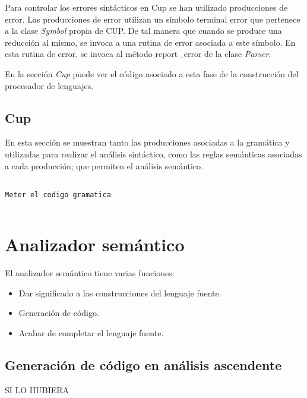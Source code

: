 Para controlar los errores sintácticos en Cup se han utilizado producciones de error. Las producciones de error utilizan un símbolo terminal error que pertenece a la clase \textit{Symbol} propia de CUP.\newline
De tal manera que cuando se produce una reducción al mismo, se invoca a una rutina de error asociada a este símbolo. En esta rutina de error, se invoca al método report\_error de la clase \textit{Parser}.

En la sección \textit{Cup} puede ver el código asociado a esta fase de la construcción del procesador de lenguajes.
\clearpage


\subsection{Cup}

En esta sección se muestran tanto las producciones asociadas a la gramática y utilizadas para realizar el análisis sintáctico, como las reglas semánticas asociadas a cada producción; que permiten el análisis semántico. 

\begin{lstlisting}[caption=Analizador Sintáctico y Semántico en CUP]

Meter el codigo gramatica


\end{lstlisting}

\section{Analizador semántico}

El analizador semántico tiene varias funciones:

\begin{itemize}
	\item Dar significado a las construcciones del lenguaje fuente. 
	\item Generación de código.
	\item Acabar de completar el lenguaje fuente.
\end{itemize}

\subsection{Generación de código en análisis ascendente}

SI LO HUBIERA
